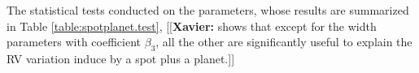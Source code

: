 \documentclass[11pt, oneside]{article}
\newcommand{\xavier}[1]{{\color{blue}[[\textbf{Xavier: }#1]]}}
\begin{document}
The statistical tests conducted on the parameters, whose results are summarized in Table \ref{table:spotplanet.test}, \xavier{shows that except for the width parameters with coefficient $\beta_3$, all the other are significantly useful to explain the RV variation induce by a spot plus a planet.}
\end{document}
